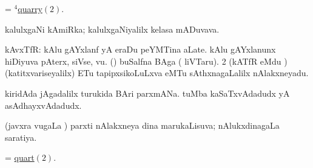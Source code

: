 \noindent
\gl{\pagu}
\bmng
{} = \hyperlink{quarry(4)2}{$^4$quarry\((2)\)}. 
\emng
\eentry

\bentry
{}
\gl{\nA}
\bmng
 kalulxgaNi kAmiRka; kalulxgaNiyalilx kelasa mADuvava. 
\emng
\eentry

\bentry
{}
\gl{\nA}
\bmng
\bnum
{} kAvxTfR: 
\banum
{} kAlu gAYxlanf yA eraDu peYMTina aLate. 
 kAlu gAYxlanunx hiDiyuva pAterx, siVse, \mo vu. 
 (\ame) buSalfna \eng{$\frac \bg 1\eg \bg 32\eg$} BAga ( liVTaru). 
\hypertarget{quart(2)}{} 
\eanum
\numie
\num{2} (kATfR eMdu \ucAcx) (katitxvariseyalilx) ETu tapipxsikoLuLxva eMTu sAthxnagaLalilx nAlakxneyadu. 
\enum
\emng

\noindent
\gl{\pagu}
\bmng
{} 
\banum
{} kiridAda jAgadalilx turukida BAri parxmANa. 
 tuMba kaSaTxvAdadudx yA asAdhayxvAdadudx. 
\eanum
\emng
\eentry

\bentry
{}
\gl{\gu}
\bmng
(javxra \mo vugaLa \vi) parxti nAlakxneya dina marukaLisuva; nAlukxdinagaLa saratiya. 
\emng
\eentry

\bentry
{}
\gl{\nA}
\bmng
= \hyperlink{quart(2)}{quart\((2)\)}. 
\emng
\eentry


